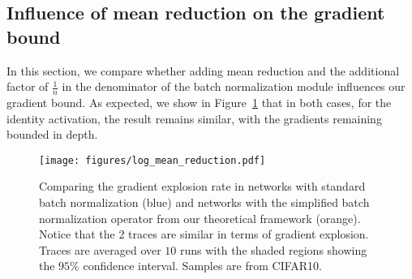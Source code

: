 \subsection*{Influence of mean reduction on the gradient bound}
In this section, we compare whether adding mean reduction and the additional factor of $\frac1n$ in the denominator of the batch normalization module influences our gradient bound. As expected, we show in Figure~\ref{grad:fig:mean_reduction} that in both cases, for the identity activation, the result remains similar, with the gradients remaining bounded in depth. 
\begin{figure}[ht!]
    \centering
    \texttt{[image: figures/log\_mean\_reduction.pdf]}
    \vspace{-.4cm}
    \caption{Comparing the gradient explosion rate in networks with standard batch normalization (blue) and networks with the simplified batch normalization operator from our theoretical framework (orange). Notice that the 2 traces are similar in terms of gradient explosion. Traces are averaged over $10$ runs with the shaded regions showing the $95\%$ confidence interval. Samples are from CIFAR10.
    }
    \label{grad:fig:mean_reduction} 
\end{figure}


